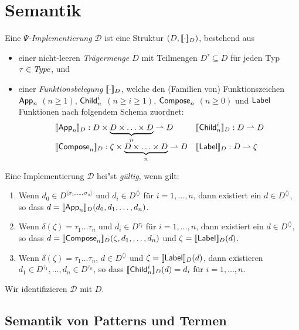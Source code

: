 \documentclass[%
  12pt,%
  a4paper,%
]{article}
\begin{document}
\section*{Semantik}

Eine \emph{$\Psi$-Implementierung} $\mathcal{D}$ ist eine Struktur $(D,[\![\cdot]\!]_D)$, bestehend aus
\begin{itemize}
\item einer nicht-leeren \emph{Tr\"agermenge $D$} mit Teilmengen $D^\tau \subseteq D$ f\"ur jeden Typ
  $\tau \in \mathit{Type}$, und
\item einer \emph{Funktionsbelegung $[\![\cdot]\!]_D$}, welche den (Familien von) Funktionszeichen
  $\mathsf{App}_n$ $(n \ge 1)$, $\mathsf{Child}_n^i$ $(n \ge i \ge 1)$, $\mathsf{Compose}_n$ $(n \ge 0)$ und $\mathsf{Label}$ Funktionen
  nach folgendem Schema zuordnet:
  \[\begin{array}{ll}
    \sem{\App_n}_D: D \times \underbrace{D \times \ldots \times D}_n \pto D &
    \sem{\Child_n^i}_D: D \pto D \\
    \sem{\Compose_n}_D: \zeta \times \underbrace{D \times \ldots \times D}_n \pto D &
    \sem{\Label}_D: D \pto \zeta \\
  \end{array}\]
\end{itemize}
Eine Implementierung $\mathcal{D}$ hei"st \emph{g\"ultig}, wenn gilt:
\begin{enumerate}
\item Wenn $d_0 \in D^{\langle \sigma_1,\ldots,\sigma_n \rangle}$ und $d_i \in D^{\langle \rangle}$ f\"ur $i=1,\ldots,n$,
  dann existiert ein $d \in D^{\langle \rangle}$, so dass $d = [\![\mathsf{App}_n]\!]_D(d_0,d_1,\ldots,d_n)$.
\item Wenn $\delta(\zeta) = \tau_1\ldots\tau_n$ und $d_i \in D^{\tau_i}$ f\"ur $i=1,\ldots,n$,
  dann existiert ein $d \in D^{\langle \rangle}$, so dass $d = [\![\mathsf{Compose}_n]\!]_D(\zeta,d_1,\ldots,d_n)$
  und $\zeta = [\![\mathsf{Label}]\!]_D(d)$.
\item Wenn $\delta(\zeta) = \tau_1\ldots\tau_n$, $d \in D^{\langle \rangle}$ und $\zeta = [\![\mathsf{Label}]\!]_D(d)$, dann
  existieren $d_1 \in D^{\tau_1},\ldots,d_n \in D^{\tau_n}$, so dass $[\![\mathsf{Child}_n^i]\!]_D(d) = d_i$ f\"ur $i=1,\ldots,n$.
\end{enumerate}
Wir identifizieren $\mathcal{D}$ mit $D$.

\subsection*{Semantik von Patterns und Termen}
\end{document}
